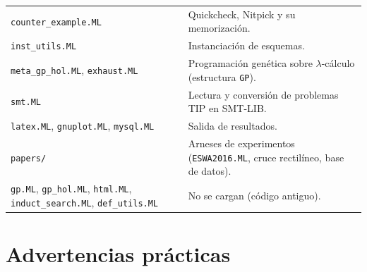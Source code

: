 \documentclass[11pt,a4paper]{article}
\newcommand{\isa}[1]{\texttt{#1}}
\theoremstyle{definition}
\theoremstyle{remark}
\begin{document}
\begin{longtable}{@{}p{4.3cm}p{10.4cm}@{}}
\isa{counter\_example.ML} & Quickcheck, Nitpick y su memorización.\\
\isa{inst\_utils.ML} & Instanciación de esquemas.\\
\isa{meta\_gp\_hol.ML}, \isa{exhaust.ML} & Programación genética sobre $\lambda$-cálculo (estructura \isa{GP}).\\
\isa{smt.ML} & Lectura y conversión de problemas TIP en SMT-LIB.\\
\isa{latex.ML}, \isa{gnuplot.ML}, \isa{mysql.ML} & Salida de resultados.\\
\isa{papers/} & Arneses de experimentos (\isa{ESWA2016.ML}, cruce rectilíneo, base de datos).\\
\isa{gp.ML}, \isa{gp\_hol.ML}, \isa{html.ML}, \isa{induct\_search.ML}, \isa{def\_utils.ML} & No se cargan (código antiguo).\\
\bottomrule
\end{longtable}

\section{Advertencias prácticas}
\end{document}
